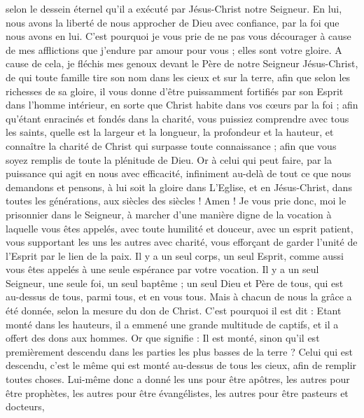 \begin{multicols}{2}
selon le dessein éternel qu’il a exécuté par Jésus-Christ notre Seigneur.
En lui, nous avons la liberté de nous approcher de Dieu avec confiance, par la foi que nous avons en lui.
C'est pourquoi je vous prie de ne pas vous décourager à cause de mes afflictions que j’endure par amour pour vous ; elles sont votre gloire.
A cause de cela, je fléchis mes genoux devant le Père de notre Seigneur Jésus-Christ,
de qui toute famille tire son nom dans les cieux et sur la terre,
afin que selon les richesses de sa gloire, il vous donne d'être puissamment fortifiés par son Esprit dans l'homme intérieur,
en sorte que Christ habite dans vos cœurs par la foi ; afin qu’étant enracinés et fondés dans la charité,
vous puissiez comprendre avec tous les saints, quelle est la largeur et la longueur, la profondeur et la hauteur,
et connaître la charité de Christ qui surpasse toute connaissance ; afin que vous soyez remplis de toute la plénitude de Dieu.
Or à celui qui peut faire, par la puissance qui agit en nous avec efficacité, infiniment au-delà de tout ce que nous demandons et pensons,
à lui soit la gloire dans L’Eglise, et en Jésus-Christ, dans toutes les générations, aux siècles des siècles ! Amen !
\VerseOne{}Je vous prie donc, moi le prisonnier dans le Seigneur, à marcher d'une manière digne de la vocation à laquelle vous êtes appelés,
avec toute humilité et douceur, avec un esprit patient, vous supportant les uns les autres avec charité,
vous efforçant de garder l'unité de l'Esprit par le lien de la paix.
Il y a un seul corps, un seul Esprit, comme aussi vous êtes appelés à une seule espérance par votre vocation.
Il y a un seul Seigneur, une seule foi, un seul baptême ;
un seul Dieu et Père de tous, qui est au-dessus de tous, parmi tous, et en vous tous.
Mais à chacun de nous la grâce a été donnée, selon la mesure du don de Christ.
C'est pourquoi il est dit : Etant monté dans les hauteurs, il a emmené une grande multitude de captifs, et il a offert des dons aux hommes.
Or que signifie : Il est monté, sinon qu’il est premièrement descendu dans les parties les plus basses de la terre ?
Celui qui est descendu, c'est le même qui est monté au-dessus de tous les cieux, afin de remplir toutes choses.
Lui-même donc a donné les uns pour être apôtres, les autres pour être prophètes, les autres pour être évangélistes, les autres pour être pasteurs et docteurs,

\end{multicols}
